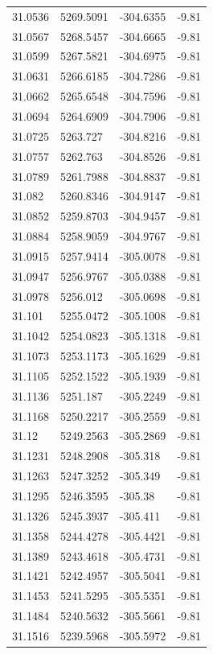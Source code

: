 \begin{table}[H]
\begin{tabular}{llll}
31.0536 & 5269.5091 & -304.6355 & -9.81 \\
31.0567 & 5268.5457 & -304.6665 & -9.81 \\
31.0599 & 5267.5821 & -304.6975 & -9.81 \\
31.0631 & 5266.6185 & -304.7286 & -9.81 \\
31.0662 & 5265.6548 & -304.7596 & -9.81 \\
31.0694 & 5264.6909 & -304.7906 & -9.81 \\
31.0725 & 5263.727 & -304.8216 & -9.81 \\
31.0757 & 5262.763 & -304.8526 & -9.81 \\
31.0789 & 5261.7988 & -304.8837 & -9.81 \\
31.082 & 5260.8346 & -304.9147 & -9.81 \\
31.0852 & 5259.8703 & -304.9457 & -9.81 \\
31.0884 & 5258.9059 & -304.9767 & -9.81 \\
31.0915 & 5257.9414 & -305.0078 & -9.81 \\
31.0947 & 5256.9767 & -305.0388 & -9.81 \\
31.0978 & 5256.012 & -305.0698 & -9.81 \\
31.101 & 5255.0472 & -305.1008 & -9.81 \\
31.1042 & 5254.0823 & -305.1318 & -9.81 \\
31.1073 & 5253.1173 & -305.1629 & -9.81 \\
31.1105 & 5252.1522 & -305.1939 & -9.81 \\
31.1136 & 5251.187 & -305.2249 & -9.81 \\
31.1168 & 5250.2217 & -305.2559 & -9.81 \\
31.12 & 5249.2563 & -305.2869 & -9.81 \\
31.1231 & 5248.2908 & -305.318 & -9.81 \\
31.1263 & 5247.3252 & -305.349 & -9.81 \\
31.1295 & 5246.3595 & -305.38 & -9.81 \\
31.1326 & 5245.3937 & -305.411 & -9.81 \\
31.1358 & 5244.4278 & -305.4421 & -9.81 \\
31.1389 & 5243.4618 & -305.4731 & -9.81 \\
31.1421 & 5242.4957 & -305.5041 & -9.81 \\
31.1453 & 5241.5295 & -305.5351 & -9.81 \\
31.1484 & 5240.5632 & -305.5661 & -9.81 \\
31.1516 & 5239.5968 & -305.5972 & -9.81 \\

\end{tabular}
\end{table}
